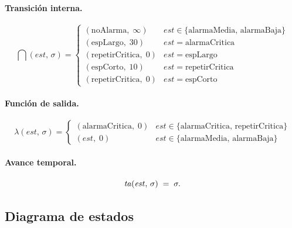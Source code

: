 \paragraph{Transición interna.}
\[
\dint(\mathit{est},\,\sigma) =
\begin{cases}
  (\mathrm{noAlarma},\;\infty)       & \mathit{est}\in\{\mathrm{alarmaMedia},\,\mathrm{alarmaBaja}\} \\[4pt]
  (\mathrm{espLargo},\;30)           & \mathit{est} = \mathrm{alarmaCritica} \\[4pt]
  (\mathrm{repetirCritica},\;0)      & \mathit{est} = \mathrm{espLargo} \\[4pt]
  (\mathrm{espCorto},\;10)           & \mathit{est} = \mathrm{repetirCritica} \\[4pt]
  (\mathrm{repetirCritica},\;0)      & \mathit{est} = \mathrm{espCorto}
\end{cases}
\]

\paragraph{Función de salida.}
\[
\lambda(\mathit{est},\,\sigma) =
\begin{cases}
  (\mathrm{alarmaCritica},\;0)
    & \mathit{est}\in\{\mathrm{alarmaCritica},\,\mathrm{repetirCritica}\} \\[4pt]
  (\mathit{est},\;0)
    & \mathit{est}\in\{\mathrm{alarmaMedia},\,\mathrm{alarmaBaja}\}
\end{cases}
\]

\paragraph{Avance temporal.}
\[
  \mathit{ta}(\mathit{est},\,\sigma) \;=\; \sigma.
\]

\subsection{Diagrama de estados}

